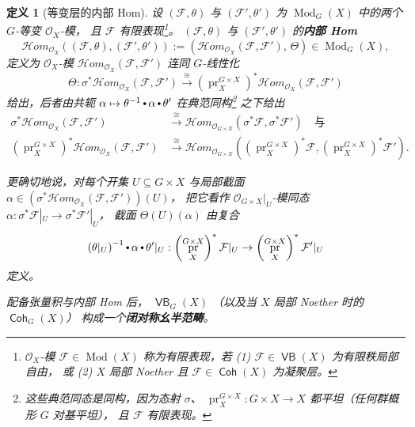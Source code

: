 \documentclass[11pt,a4paper]{article}
\renewcommand{\emph}[1]{{\bfseries #1}}
\DeclareMathOperator{\Mod}{\mathrm{Mod}}
\DeclareMathOperator{\Coh}{\mathsf{Coh}}
\DeclareMathOperator{\VB}{\mathsf{VB}}
\DeclareMathOperator{\pr}{\operatorname{pr}}
\DeclareMathOperator{\comp}{\vcenter{\hbox{\scalebox{0.65}{$\bullet$}}}}
\theoremstyle{cnth}
\newtheorem{defn}[thm]{定义}
\begin{document}
\begin{defn}[等变层的内部 Hom]
\label{defn:InternalHomOfEquivariantModules}
设 $(\mathcal{F}, \theta)$ 与 $(\mathcal{F}', \theta')$ 为 $\Mod_G(X)$ 中的两个 $G$-等变 $\mathcal{O}_X$-模，
且 $\mathcal{F}$ 有限表现\footnote{
$\mathcal{O}_X$-模 $\mathcal{F}\in\Mod(X)$
称为有限表现，若
(1)
$\mathcal{F}\in\VB(X)$ 为有限秩局部自由，
或
(2)
$X$ 局部 Noether 且 $\mathcal{F}\in\Coh(X)$ 为凝聚层。
}。
$(\mathcal{F}, \theta)$ 与 $(\mathcal{F}', \theta')$ 的\emph{内部 Hom}
$$
\mathcal{H}om_{\mathcal{O}_X}\left( (\mathcal{F}, \theta), (\mathcal{F}', \theta') \right)
:=
\left( \mathcal{H}om_{\mathcal{O}_X}(\mathcal{F}, \mathcal{F}'), \, \Theta \right)
\in
\Mod_G(X),
$$
定义为 $\mathcal{O}_X$-模 $\mathcal{H}om_{\mathcal{O}_X}(\mathcal{F}, \mathcal{F}')$
连同 $G$-线性化
$$
\Theta
:
\sigma^*\mathcal{H}om_{\mathcal{O}_X}(\mathcal{F}, \mathcal{F}')
\xrightarrow{\cong}
\left(\pr_X^{G \times X}\right)^* \mathcal{H}om_{\mathcal{O}_X}(\mathcal{F}, \mathcal{F}')
$$
给出，后者由共轭
$
\alpha
\mapsto
\theta^{-1}
\comp
\alpha
\comp
\theta'
$
在典范同构\footnote{
这些典范同态是同构，因为态射
$\sigma$、
$\pr_X^{G\times X}
:
G \times X \rightarrow X$
都平坦（任何群概形 $G$ 对基平坦），
且 $\mathcal{F}$ 有限表现。
}
之下给出
\begin{align*}
\sigma^* \mathcal{H}om_{\mathcal{O}_X}(\mathcal{F}, \mathcal{F}')
&\xrightarrow{\cong}
\mathcal{H}om_{\mathcal{O}_{G \times X}}\left(\sigma^* \mathcal{F}, \sigma^* \mathcal{F}'\right)
\quad\text{与}\quad
\\[2mm]
\left(\pr_X^{G \times X}\right)^* \mathcal{H}om_{\mathcal{O}_X}(\mathcal{F}, \mathcal{F}')
&\xrightarrow{\cong}
\mathcal{H}om_{\mathcal{O}_{G \times X}}\left(\left(\pr_X^{G \times X}\right)^*\mathcal{F}, \left(\pr_X^{G \times X}\right)^*\mathcal{F}'\right).
\end{align*}

更确切地说，对每个开集 $U \subseteq G \times X$ 与局部截面
$
\alpha \in \left(\sigma^*\mathcal{H}om_{\mathcal{O}_X}(\mathcal{F}, \mathcal{F}')\right)(U)
$，
把它看作 $\mathcal{O}_{G\times X}|_U$-模同态
$
\alpha : \sigma^*\mathcal{F}|_U \rightarrow \sigma^*\mathcal{F}'|_U
$，
截面 $\Theta(U)(\alpha)$ 由复合
$$
\left(\theta|_U\right)^{-1}
\comp
\alpha
\comp
\theta'|_U
:
\left(\pr_X^{G \times X}\right)^*\mathcal{F}|_U
\rightarrow
\left(\pr_X^{G \times X}\right)^*\mathcal{F}'|_U
$$
定义。

配备张量积与内部 Hom 后，
$\VB_G(X)$
（以及当 $X$ 局部 Noether 时的 $\Coh_G(X)$）
构成一个\emph{闭对称幺半范畴}。

\end{defn}
\end{document}
